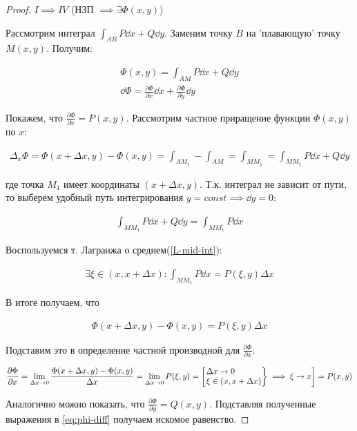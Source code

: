 \begin{proof}
  \(I \implies IV\) (НЗП \(\implies \exists \Phi(x, y)\))

  Рассмотрим интеграл \(\int_{AB} P \dd x + Q \dd y\).
  Заменим точку \(B\) на 'плавающую' точку \(M(x, y)\). Получим:

  \begin{align*}
    \Phi(x, y) = \int_{AM} P \dd x + Q \dd y \\
    \dd \Phi
    = \frac{\partial \Phi}{\partial x} \dd x
      + \frac{\partial \Phi}{\partial y} \dd y
    \label{eq:phi-diff}\tag{1}
  \end{align*}

  Покажем, что \(\displaystyle \frac{\partial \Phi}{\partial x} = P(x, y)\).
  Рассмотрим частное приращение функции \(\Phi(x, y)\) по \(x\):

  \begin{align*}
    \Delta_{x} \Phi
    = \Phi(x + \Delta x, y) - \Phi(x, y)
    = \int_{AM_{1}} - \int_{AM}
    = \int_{MM_{1}}
    = \int_{MM_{1}} P \dd x + Q \dd y
  \end{align*}

  где точка \(M_{1}\) имеет координаты \((x + \Delta x, y)\). Т.к. интеграл не
  зависит от пути, то выберем удобный путь интегрирования
  \(y = const \implies \dd y = 0\):

  \begin{align*}
    \int_{MM_{1}} P \dd x + Q \dd y
    = \int_{MM_{1}} P \dd x
  \end{align*}

  Воспользуемся т. Лагранжа о среднем(\ref{L-mid-int}):

  \begin{align*}
    \exists \xi \in (x, x + \Delta x) \colon 
      \int_{MM_{1}} P \dd x = P(\xi, y) \Delta x    
  \end{align*}

  В итоге получаем, что
  
  \begin{align*}
    \Phi(x + \Delta x, y) - \Phi(x, y) = P(\xi, y) \Delta x
  \end{align*}

  Подставим это в определение частной производной  для
  \(\displaystyle \frac{\partial \Phi}{\partial x}\):

  \begin{align*}
    \frac{\partial \Phi}{\partial x}
    = \lim_{\Delta x \to 0}
      \frac{\Phi(x + \Delta x, y) - \Phi(x, y)}{\Delta x}
    = \lim_{\Delta x \to 0} P(\xi, y)
    = \begin{bmatrix}
      \begin{rcases}
        \Delta x \to 0 \\
        \xi \in (x, x + \Delta x)
      \end{rcases}
      \implies \xi \to x
    \end{bmatrix}
    = P(x, y)
  \end{align*}

  Аналогично можно показать, что
  \(\displaystyle \frac{\partial \Phi}{\partial y} = Q(x, y)\).
  Подставляя полученные выражения в \eqref{eq:phi-diff} получаем искомое
  равенство.
\end{proof}
